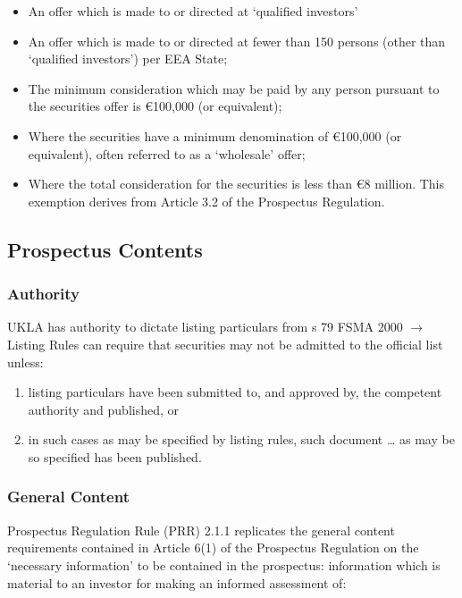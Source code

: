 \documentclass[
]{article}
\providecommand{\tightlist}{%
  \setlength{\itemsep}{0pt}\setlength{\parskip}{0pt}}
\begin{document}
\begin{itemize}
\tightlist
\item
  An offer which is made to or directed at `qualified investors'
\item
  An offer which is made to or directed at fewer than 150 persons (other
  than `qualified investors') per EEA State;
\item
  The minimum consideration which may be paid by any person pursuant to
  the securities offer is €100,000 (or equivalent);
\item
  Where the securities have a minimum denomination of €100,000 (or
  equivalent), often referred to as a `wholesale' offer;
\item
  Where the total consideration for the securities is less than €8
  million. This exemption derives from Article 3.2 of the Prospectus
  Regulation.
\end{itemize}

\hypertarget{prospectus-contents}{%
\subsection{Prospectus Contents}\label{prospectus-contents}}

\hypertarget{authority}{%
\subsubsection{Authority}\label{authority}}

UKLA has authority to dictate listing particulars from s 79 FSMA 2000
{\(\rightarrow\)} Listing Rules can require that securities may not be
admitted to the official list unless:

\begin{enumerate}
\tightlist
\item
  listing particulars have been submitted to, and approved by, the
  competent authority and published, or
\item
  in such cases as may be specified by listing rules, such document
  \ldots{} as may be so specified has been published.
\end{enumerate}

\hypertarget{general-content}{%
\subsubsection{General Content}\label{general-content}}

Prospectus Regulation Rule (PRR) 2.1.1 replicates the general content
requirements contained in Article 6(1) of the Prospectus Regulation on
the `necessary information' to be contained in the prospectus:
information which is material to an investor for making an informed
assessment of:
\end{document}
